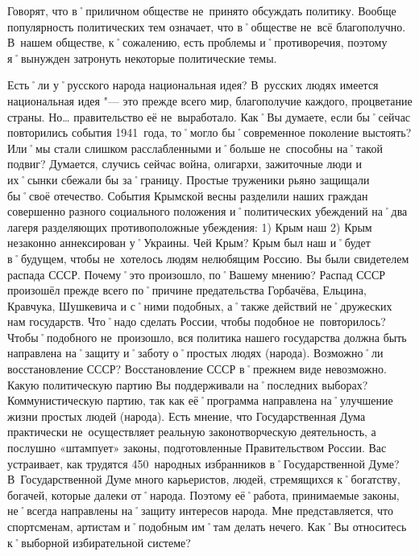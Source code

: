 \begin{drama}
	\maxspeaks Говорят, что в˚приличном обществе не~принято обсуждать политику. Вообще популярность политических тем означает, что в˚обществе не~всё благополучно. В~нашем обществе, к˚сожалению, есть проблемы и˚противоречия, поэтому я˚вынужден затронуть некоторые политические темы.
	
	Есть˚ли у˚русского народа национальная идея?
	\michaelspeaks В~русских людях имеется национальная идея "--- это прежде всего мир, благополучие каждого, процветание страны. Но… правительство её не~выработало.
	\maxspeaks Как˚Вы думаете, если бы˚сейчас повторились события 1941~года, то˚могло бы˚современное поколение выстоять? Или˚мы стали слишком расслабленными и˚больше не~способны на˚такой подвиг?
	\michaelspeaks Думается, случись сейчас война, олигархи, зажиточные люди и их˚сынки сбежали бы за˚границу. Простые труженики рьяно защищали бы˚своё отечество.
	\maxspeaks События Крымской весны разделили наших граждан совершенно разного социального положения и˚политических убеждений на˚два лагеря разделяющих противоположные убеждения: 1) Крым наш 2) Крым незаконно аннексирован у˚Украины. Чей Крым?
	\michaelspeaks Крым был наш и˚будет в˚будущем, чтобы не~хотелось людям нелюбящим Россию.
	\maxspeaks Вы были свидетелем распада СССР. Почему˚это произошло, по˚Вашему мнению? 
	\michaelspeaks Распад СССР произошёл прежде всего по˚причине предательства Горбачёва, Ельцина, Кравчука, Шушкевича и с˚ними подобных, а˚также действий не˚дружеских нам государств.	
	\maxspeaks Что˚надо сделать России, чтобы подобное не~повторилось? 
	\michaelspeaks Чтобы˚подобного не~произошло, вся политика нашего государства должна быть направлена на˚защиту и˚заботу о˚простых людях (народа).
	\maxspeaks Возможно˚ли восстановление СССР?
	\michaelspeaks Восстановление СССР в˚прежнем виде невозможно. 
	\maxspeaks Какую политическую партию Вы поддерживали на˚последних выборах? 
	\michaelspeaks Коммунистическую партию, так как её˚программа направлена на˚улучшение жизни простых людей (народа).
	\maxspeaks Есть мнение, что Государственная Дума практически не~осуществляет реальную законотворческую деятельность, а послушно «штампует» законы, подготовленные Правительством России. Вас устраивает, как трудятся 450~народных избранников в˚Государственной Думе? 
	\michaelspeaks В~Государственной Думе много карьеристов, людей, стремящихся к˚богатству, богачей, которые далеки от˚народа. Поэтому её˚работа, принимаемые законы, не˚всегда направлены на˚защиту интересов народа. Мне представляется, что спортсменам, артистам и˚подобным им˚там делать нечего.
	\maxspeaks Как˚Вы относитесь к˚выборной избирательной системе? 

\end{drama}
